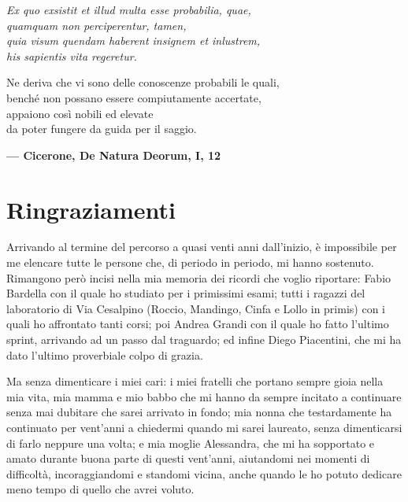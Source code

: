
\begin{flushright}
{
	\emph{
		Ex quo exsistit et illud multa esse probabilia, quae, \\
		quamquam non perciperentur, tamen, \\
		quia visum quendam haberent insignem et inlustrem, \\
		his sapientis vita regeretur. \\
	}

	\medskip

	Ne deriva che vi sono delle conoscenze probabili le quali, \\
	benché non possano essere compiutamente accertate, \\
	appaiono così nobili ed elevate \\
	da poter fungere da guida per il saggio. \\

	\medskip

	\textbf{--- Cicerone, De Natura Deorum, I, 12} 
}
\end{flushright}

\bigskip

\begingroup
\let\clearpage\relax
\let\cleardoublepage\relax
\let\cleardoublepage\relax
\chapter*{Ringraziamenti}

Arrivando al termine del percorso a quasi venti anni dall'inizio, è
impossibile per me elencare tutte le persone che, di periodo in periodo, mi
hanno sostenuto. Rimangono però incisi nella mia memoria dei ricordi che
voglio riportare: Fabio Bardella con il quale ho studiato per i primissimi
esami; tutti i ragazzi del laboratorio di Via Cesalpino (Roccio, Mandingo,
Cinfa e Lollo in primis) con i quali ho affrontato tanti corsi; poi Andrea
Grandi con il quale ho fatto l'ultimo sprint, arrivando ad un passo dal
traguardo; ed infine Diego Piacentini, che mi ha dato l'ultimo proverbiale
colpo di grazia.

\bigskip

Ma senza dimenticare i miei cari: i miei fratelli che portano sempre gioia
nella mia vita, mia mamma e mio babbo che mi hanno da sempre incitato a
continuare senza mai dubitare che sarei arrivato in fondo; mia nonna che
testardamente ha continuato per vent'anni a chiedermi quando mi sarei
laureato, senza dimenticarsi di farlo neppure una volta; e mia moglie
Alessandra, che mi ha sopportato e amato durante buona parte di questi
vent'anni, aiutandomi nei momenti di difficoltà, incoraggiandomi e standomi
vicina, anche quando le ho potuto dedicare meno tempo di quello che avrei voluto.
\endgroup

